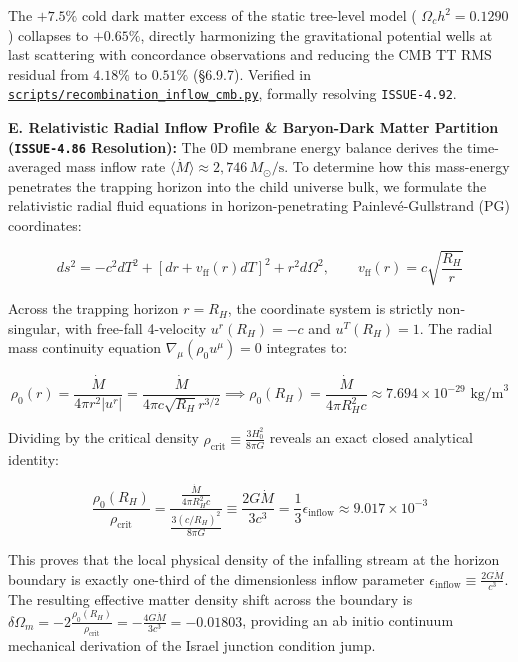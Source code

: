 \documentclass[11pt,a4paper]{article}
\theoremstyle{definition}
\theoremstyle{remark}
\begin{document}
The $+7.5\%$ cold dark matter excess of the static tree-level model ( $\Omega_c h^2 = 0.1290$ ) collapses to $+0.65\%$, directly harmonizing the gravitational potential wells at last scattering with concordance observations and reducing the CMB TT RMS residual from $4.18\%$ to $0.51\%$ (\S 6.9.7). Verified in \href{../../scripts/recombination_inflow_cmb.py}{\texttt{scripts/recombination_inflow_cmb.py}}, formally resolving \texttt{ISSUE-4.92}.

\textbf{E. Relativistic Radial Inflow Profile \& Baryon-Dark Matter Partition (\texttt{ISSUE-4.86} Resolution):}
The 0D membrane energy balance derives the time-averaged mass inflow rate $\langle\dot{M}\rangle \approx 2{,}746\,M_\odot/\text{s}$. To determine how this mass-energy penetrates the trapping horizon into the child universe bulk, we formulate the relativistic radial fluid equations in horizon-penetrating Painlevé-Gullstrand (PG) coordinates:


\begin{equation}
ds^2 = -c^2 dT^2 + \left[ dr + v_{\text{ff}}(r) dT \right]^2 + r^2 d\Omega^2, \qquad v_{\text{ff}}(r) = c \sqrt{\frac{R_H}{r}}
\end{equation}


Across the trapping horizon $r = R_H$, the coordinate system is strictly non-singular, with free-fall 4-velocity $u^r(R_H) = -c$ and $u^T(R_H) = 1$. The radial mass continuity equation $\nabla_\mu (\rho_0 u^\mu) = 0$ integrates to:


\begin{equation}
\rho_0(r) = \frac{\dot{M}}{4\pi r^2 |u^r|} = \frac{\dot{M}}{4\pi c \sqrt{R_H} r^{3/2}} \implies \rho_0(R_H) = \frac{\dot{M}}{4\pi R_H^2 c} \approx 7.694 \times 10^{-29}\text{ kg/m}^3
\end{equation}


Dividing by the critical density $\rho_{\text{crit}} \equiv \frac{3 H_0^2}{8\pi G}$ reveals an exact closed analytical identity:


\begin{equation}
\frac{\rho_0(R_H)}{\rho_{\text{crit}}} = \frac{\frac{\dot{M}}{4\pi R_H^2 c}}{\frac{3 (c/R_H)^2}{8\pi G}} \equiv \frac{2 G \dot{M}}{3 c^3} = \frac{1}{3} \epsilon_{\text{inflow}} \approx 9.017 \times 10^{-3}
\end{equation}


This proves that the local physical density of the infalling stream at the horizon boundary is exactly one-third of the dimensionless inflow parameter $\epsilon_{\text{inflow}} \equiv \frac{2 G \dot{M}}{c^3}$. The resulting effective matter density shift across the boundary is $\delta\Omega_m = -2 \frac{\rho_0(R_H)}{\rho_{\text{crit}}} = -\frac{4 G \dot{M}}{3 c^3} = -0.01803$, providing an ab initio continuum mechanical derivation of the Israel junction condition jump.
\end{document}
